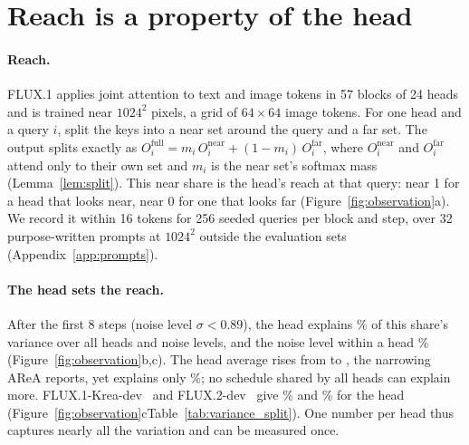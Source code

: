\documentclass{article} %
\newcommand{\fullonly}[1]{\ifshortversion\else#1\fi}
\newcommand{\shortalt}[2]{\ifshortversion#2\else#1\fi}
\newcommand{\Ofull}{O^{\mathrm{full}}}
\theoremstyle{remark}
\begin{document}
\section{Reach is a property of the head}
\label{sec:observation}\label{sec:analysis}

\paragraph{Reach.} FLUX.1 applies joint attention to text and image tokens in 57 blocks of 24 heads and is trained near $1024^2$ pixels, a grid of $64\times64$ image tokens. For one head and a query $i$, split the keys into a near set around the query and a far set. The output splits exactly as $\Ofull_i=m_i\,O^{\mathrm{near}}_i+(1-m_i)\,O^{\mathrm{far}}_i$, where $O^{\mathrm{near}}_i$ and $O^{\mathrm{far}}_i$ attend only to their own set and $m_i$ is the near set's softmax mass (Lemma~\ref{lem:split}). This near share is the head's reach at that query: near 1 for a head that looks near, near 0 for one that looks far (Figure~\ref{fig:observation}a). We record it within 16 tokens for 256 seeded queries per block and step, over 32 purpose-written prompts at $1024^2$ outside the evaluation sets\fullonly{ (Appendix~\ref{app:prompts})}.

\paragraph{The head sets the reach.} After the first 8 steps (noise level $\sigma<0.89$), the head explains \hlVarHead\% of this share's variance over all heads and noise levels, and the noise level within a head \hlVarStep\% (Figure~\ref{fig:observation}b,c). The head average rises from \hlVarCurveLo{} to \hlVarCurveHi{}, the narrowing AReA reports, yet explains only \hlVarAvg\%; no schedule shared by all heads can explain more. FLUX.1-Krea-dev~\citep{krea2025flux} and FLUX.2-dev~\citep{flux2_2025} give \hlVarHeadKrea\% and \hlVarHeadFluxTwo\% for the head (\shortalt{Table~\ref{tab:variance_split}}{Figure~\ref{fig:observation}c}). One number per head thus captures nearly all the variation and can be measured once.
\end{document}

